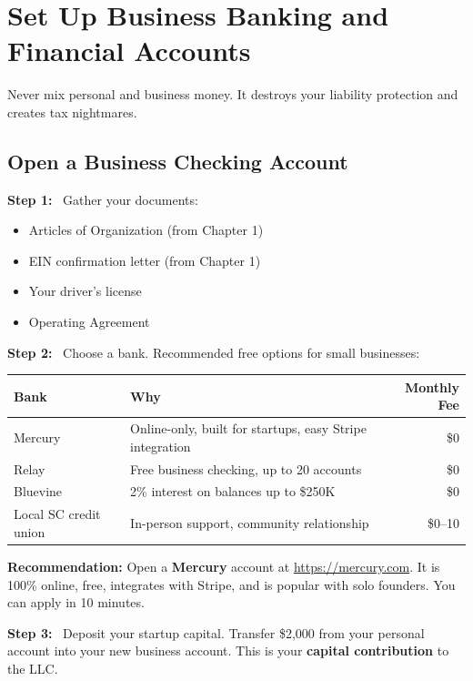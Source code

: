 \documentclass[12pt, letterpaper, oneside]{book}
\newcommand{\step}[1]{\noindent\textbf{\textcolor{primary}{Step #1:}}~}
\begin{document}
\chapter{Set Up Business Banking and Financial Accounts}

Never mix personal and business money. It destroys your liability protection and creates tax nightmares.

\section{Open a Business Checking Account}

\step{1} Gather your documents:
\begin{itemize}[leftmargin=2em]
  \item Articles of Organization (from Chapter 1)
  \item EIN confirmation letter (from Chapter 1)
  \item Your driver's license
  \item Operating Agreement
\end{itemize}

\step{2} Choose a bank. Recommended free options for small businesses:

\begin{table}[H]
\centering
\begin{tabularx}{\textwidth}{lXr}
\toprule
\textbf{Bank} & \textbf{Why} & \textbf{Monthly Fee} \\
\midrule
Mercury & Online-only, built for startups, easy Stripe integration & \$0 \\
Relay & Free business checking, up to 20 accounts & \$0 \\
Bluevine & 2\% interest on balances up to \$250K & \$0 \\
Local SC credit union & In-person support, community relationship & \$0--10 \\
\bottomrule
\end{tabularx}
\end{table}

\begin{infobox}
\textbf{Recommendation:} Open a \textbf{Mercury} account at \url{https://mercury.com}. It is 100\% online, free, integrates with Stripe, and is popular with solo founders. You can apply in 10 minutes.
\end{infobox}

\step{3} Deposit your startup capital. Transfer \$2{,}000 from your personal account into your new business account. This is your \textbf{capital contribution} to the LLC.
\end{document}
